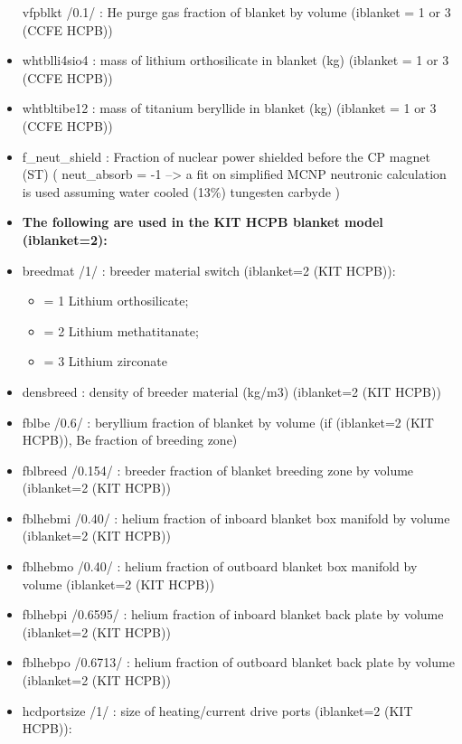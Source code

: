 \documentclass[]{article}
\providecommand{\tightlist}{%
  \setlength{\itemsep}{0pt}\setlength{\parskip}{0pt}}
\begin{document}
\begin{itemize}
  vfpblkt /0.1/ : He purge gas fraction of blanket by volume (iblanket =
  1 or 3 (CCFE HCPB))
\item
  whtblli4sio4 : mass of lithium orthosilicate in blanket (kg) (iblanket
  = 1 or 3 (CCFE HCPB))
\item
  whtbltibe12 : mass of titanium beryllide in blanket (kg) (iblanket = 1
  or 3 (CCFE HCPB))
\item
  f\_neut\_shield : Fraction of nuclear power shielded before the CP
  magnet (ST) ( neut\_absorb = -1 --\textgreater{} a fit on simplified
  MCNP neutronic calculation is used assuming water cooled (13\%)
  tungesten carbyde )
\item
  \textbf{The following are used in the KIT HCPB blanket model
  (iblanket=2):}
\item
  breedmat /1/ : breeder material switch (iblanket=2 (KIT HCPB)):

  \begin{itemize}
  \tightlist
  \item
    = 1 Lithium orthosilicate;
  \item
    = 2 Lithium methatitanate;
  \item
    = 3 Lithium zirconate
  \end{itemize}
\item
  densbreed : density of breeder material (kg/m3) (iblanket=2 (KIT
  HCPB))
\item
  fblbe /0.6/ : beryllium fraction of blanket by volume (if (iblanket=2
  (KIT HCPB)), Be fraction of breeding zone)
\item
  fblbreed /0.154/ : breeder fraction of blanket breeding zone by volume
  (iblanket=2 (KIT HCPB))
\item
  fblhebmi /0.40/ : helium fraction of inboard blanket box manifold by
  volume (iblanket=2 (KIT HCPB))
\item
  fblhebmo /0.40/ : helium fraction of outboard blanket box manifold by
  volume (iblanket=2 (KIT HCPB))
\item
  fblhebpi /0.6595/ : helium fraction of inboard blanket back plate by
  volume (iblanket=2 (KIT HCPB))
\item
  fblhebpo /0.6713/ : helium fraction of outboard blanket back plate by
  volume (iblanket=2 (KIT HCPB))
\item
  hcdportsize /1/ : size of heating/current drive ports (iblanket=2 (KIT
  HCPB)):


\end{itemize}
\end{document}
